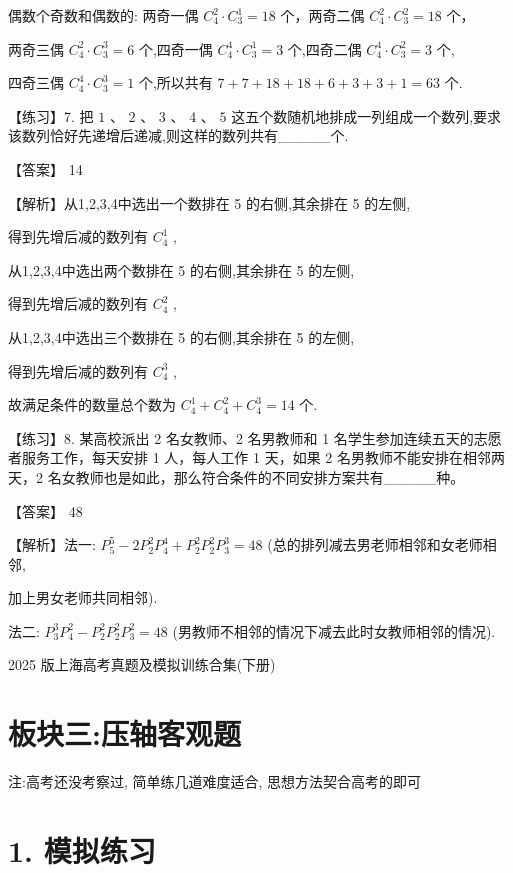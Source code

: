 \documentclass[10pt]{article}
\begin{document}
偶数个奇数和偶数的: 两奇一偶 \({C}_{4}^{2} \cdot  {C}_{3}^{1} = {18}\) 个，两奇二偶 \({C}_{4}^{2} \cdot  {C}_{3}^{2} = {18}\) 个，

两奇三偶 \({C}_{4}^{2} \cdot  {C}_{3}^{3} = 6\) 个,四奇一偶 \({C}_{4}^{4} \cdot  {C}_{3}^{1} = 3\) 个,四奇二偶 \({C}_{4}^{4} \cdot  {C}_{3}^{2} = 3\) 个,

四奇三偶 \({C}_{4}^{4} \cdot  {C}_{3}^{3} = 1\) 个,所以共有 \(7 + 7 + {18} + {18} + 6 + 3 + 3 + 1 = {63}\) 个.

【练习】7. 把 \(1\text{ 、 }2\text{ 、 }3\text{ 、 }4\text{ 、 }5\) 这五个数随机地排成一列组成一个数列,要求该数列恰好先递增后递减,则这样的数列共有\_\_\_\_\_个.

【答案】 14

【解析】从1,2,3,4中选出一个数排在 5 的右侧,其余排在 5 的左侧,

得到先增后减的数列有 \({C}_{4}^{1}\) ,

从1,2,3,4中选出两个数排在 5 的右侧,其余排在 5 的左侧,

得到先增后减的数列有 \({C}_{4}^{2}\) ,

从1,2,3,4中选出三个数排在 5 的右侧,其余排在 5 的左侧,

得到先增后减的数列有 \({C}_{4}^{3}\) ,

故满足条件的数量总个数为 \({C}_{4}^{1} + {C}_{4}^{2} + {C}_{4}^{3} = {14}\) 个.

【练习】8. 某高校派出 2 名女教师、2 名男教师和 1 名学生参加连续五天的志愿者服务工作，每天安排 1 人，每人工作 1 天，如果 2 名男教师不能安排在相邻两天，2 名女教师也是如此，那么符合条件的不同安排方案共有\_\_\_\_\_种。

【答案】 48

【解析】法一: \({P}_{5}^{5} - 2{P}_{2}^{2}{P}_{4}^{4} + {P}_{2}^{2}{P}_{2}^{2}{P}_{3}^{3} = {48}\) (总的排列减去男老师相邻和女老师相邻,

加上男女老师共同相邻).

法二: \({P}_{3}^{3}{P}_{4}^{2} - {P}_{2}^{2}{P}_{2}^{2}{P}_{3}^{2} = {48}\) (男教师不相邻的情况下减去此时女教师相邻的情况).

2025 版上海高考真题及模拟训练合集(下册)

\section*{板块三:压轴客观题}

注:高考还没考察过, 简单练几道难度适合, 思想方法契合高考的即可

\section*{1. 模拟练习}
\end{document}
